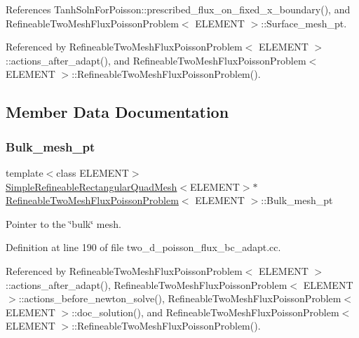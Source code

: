 References Tanh\+Soln\+For\+Poisson\+::prescribed\+\_\+flux\+\_\+on\+\_\+fixed\+\_\+x\+\_\+boundary(), and Refineable\+Two\+Mesh\+Flux\+Poisson\+Problem$<$ E\+L\+E\+M\+E\+N\+T $>$\+::\+Surface\+\_\+mesh\+\_\+pt.



Referenced by Refineable\+Two\+Mesh\+Flux\+Poisson\+Problem$<$ E\+L\+E\+M\+E\+N\+T $>$\+::actions\+\_\+after\+\_\+adapt(), and Refineable\+Two\+Mesh\+Flux\+Poisson\+Problem$<$ E\+L\+E\+M\+E\+N\+T $>$\+::\+Refineable\+Two\+Mesh\+Flux\+Poisson\+Problem().



\subsection{Member Data Documentation}
\mbox{\label{classRefineableTwoMeshFluxPoissonProblem_a35746600caac7fd5b1a2ccec6beff8d6}} 
\subsubsection{\texorpdfstring{Bulk\+\_\+mesh\+\_\+pt}{Bulk\_mesh\_pt}}
{\footnotesize\ttfamily template$<$class E\+L\+E\+M\+E\+NT$>$ \\
\hyperlink{classSimpleRefineableRectangularQuadMesh}{Simple\+Refineable\+Rectangular\+Quad\+Mesh}$<$E\+L\+E\+M\+E\+NT$>$$\ast$ \hyperlink{classRefineableTwoMeshFluxPoissonProblem}{Refineable\+Two\+Mesh\+Flux\+Poisson\+Problem}$<$ E\+L\+E\+M\+E\+NT $>$\+::Bulk\+\_\+mesh\+\_\+pt\hspace{0.3cm}{\ttfamily [private]}}



Pointer to the \char`\"{}bulk\char`\"{} mesh. 



Definition at line 190 of file two\+\_\+d\+\_\+poisson\+\_\+flux\+\_\+bc\+\_\+adapt.\+cc.



Referenced by Refineable\+Two\+Mesh\+Flux\+Poisson\+Problem$<$ E\+L\+E\+M\+E\+N\+T $>$\+::actions\+\_\+after\+\_\+adapt(), Refineable\+Two\+Mesh\+Flux\+Poisson\+Problem$<$ E\+L\+E\+M\+E\+N\+T $>$\+::actions\+\_\+before\+\_\+newton\+\_\+solve(), Refineable\+Two\+Mesh\+Flux\+Poisson\+Problem$<$ E\+L\+E\+M\+E\+N\+T $>$\+::doc\+\_\+solution(), and Refineable\+Two\+Mesh\+Flux\+Poisson\+Problem$<$ E\+L\+E\+M\+E\+N\+T $>$\+::\+Refineable\+Two\+Mesh\+Flux\+Poisson\+Problem().

